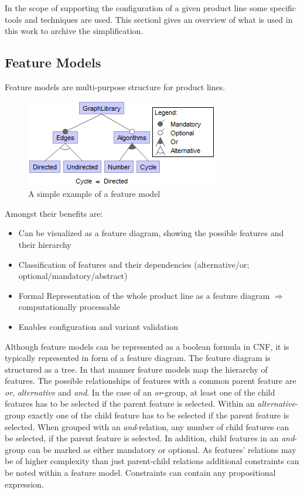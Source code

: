 In the scope of supporting the configuration of a given product line some specific tools and techniques are used. This sectionl gives an overview of what is used in this work to archive the simplification.

\subsection{Feature Models}
Feature models are multi-purpose structure for product lines. 
\begin{figure}
	\includegraphics{img/img-fm.png}
	\caption{A simple example of a feature model}
	\label{img-fm}
\end{figure}
Amongst their benefits are:
\begin{itemize}
\item Can be visualized as a feature diagram, showing the possible features and their hierarchy
\item Classification of features and their dependencies (alternative/or; optional/mandatory/abstract)
\item Formal Representation of the whole product line as a feature diagram $\Rightarrow$ computationally processable
\item Enables configuration and variant validation
\end{itemize}
Although feature models can be represented as a boolean formula in CNF, it is typically represented in form of a feature diagram. The feature diagram is structured as a tree. In that manner feature models map the hierarchy of features. The possible relationships of features with a common parent feature are \textit{or}, \textit{alternative} and \textit{and}. In the case of an \textit{or}-group, at least one of the child features has to be selected if the parent feature is selected. Within an \textit{alternative}-group exactly one of the child feature has to be selected if the parent feature is selected. When grouped with an \textit{and}-relation, any number of child features can be selected, if the parent feature is selected. In addition, child features in an \textit{and}-group can be marked as either mandatory or optional.  As features' relations may be of higher complexity than just parent-child relations additional constraints can be noted within a feature model. Constraints can contain any propositional expression.

